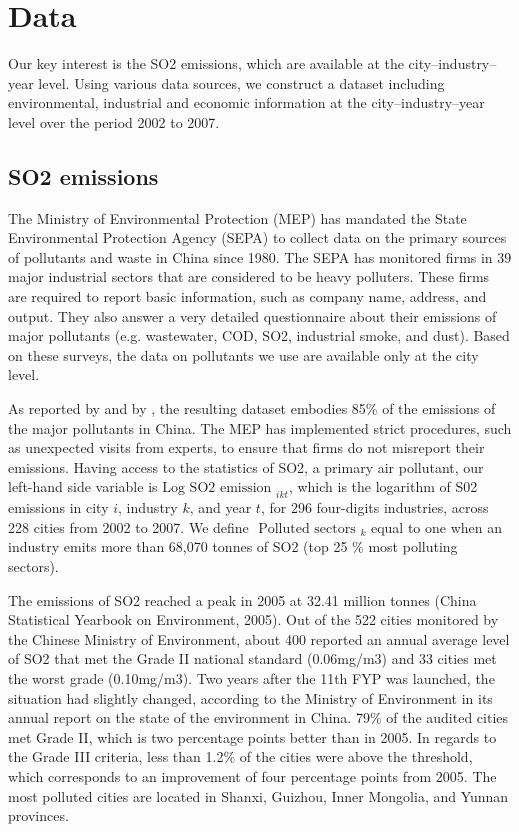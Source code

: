\documentclass[12pt]{article}
\begin{document}
\section{Data } \label{data} 



Our key interest is the SO2 emissions, which are available at the city–industry–year level. Using various data sources, we construct a dataset including environmental, industrial and economic information at the city–industry–year level over the period 2002 to 2007.


\subsection{SO2 emissions}

The Ministry of Environmental Protection (MEP) has mandated the State Environmental Protection Agency (SEPA) to collect data on the primary sources of pollutants and waste in China since 1980. The SEPA has monitored firms in 39 major industrial sectors that are considered to be heavy polluters. These firms are required to report basic information, such as company name, address, and output. They also answer a very detailed questionnaire about their emissions of major pollutants (e.g. wastewater, COD, SO2, industrial smoke, and dust). Based on these surveys, the data on pollutants we use are available only at the city level. 


As reported by \cite{Wu2017-bl} and by \cite{Jiang2014-pf}, the resulting dataset embodies 85$\%$ of the emissions of the major pollutants in China. The MEP has implemented strict procedures, such as unexpected visits from experts, to ensure that firms do not misreport their emissions. Having access to the statistics of SO2, a primary air pollutant, our left-hand side variable is $\text {Log SO2 emission }_{i k t}$, which is the logarithm of S02 emissions in city $i$, industry $k$, and year $t$, for 296 four-digits industries, across 228 cities from 2002 to 2007. We define $\text { Polluted sectors }_{k}$ equal to one when an industry emits more than 68,070 tonnes of SO2 (top 25 $\%$ most polluting sectors). 


The emissions of SO2 reached a peak in 2005 at 32.41 million tonnes (China Statistical Yearbook on Environment, 2005). Out of the 522 cities monitored by the Chinese Ministry of Environment, about 400 reported an annual average level of SO2 that met the Grade II national standard (0.06mg/m3) and 33 cities met the worst grade (0.10mg/m3). Two years after the 11th FYP was launched, the situation had slightly changed, according to the Ministry of Environment in its annual report on the state of the environment in China. 79$\%$ of the audited cities met Grade II, which is two percentage points better than in 2005. In regards to the Grade III criteria, less than 1.2$\%$ of the cities were above the threshold, which corresponds to an improvement of four percentage points from 2005. The most polluted cities are located in Shanxi, Guizhou, Inner Mongolia, and Yunnan provinces.
\end{document}
